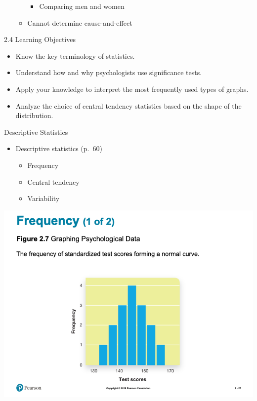 \documentclass[
]{book}
\providecommand{\tightlist}{%
  \setlength{\itemsep}{0pt}\setlength{\parskip}{0pt}}
\begin{document}
\begin{reflect}
\begin{itemize}
\begin{itemize}
    \begin{itemize}
    \tightlist
    \item
      Comparing men and women\\
    \end{itemize}
  \item
    Cannot determine cause-and-effect
  \end{itemize}
\end{itemize}

2.4 Learning Objectives

\begin{itemize}
\tightlist
\item
  Know the key terminology of statistics.\\
\item
  Understand how and why psychologists use significance tests.\\
\item
  Apply your knowledge to interpret the most frequently used types of graphs.\\
\item
  Analyze the choice of central tendency statistics based on the shape of the distribution.
\end{itemize}

Descriptive Statistics

\begin{itemize}
\tightlist
\item
  Descriptive statistics (p.~60)

  \begin{itemize}
  \tightlist
  \item
    Frequency\\
  \item
    Central tendency\\
  \item
    Variability
  \end{itemize}
\end{itemize}

\includegraphics{assets/unit_1/slide_27.png}


\end{reflect}
\end{document}
